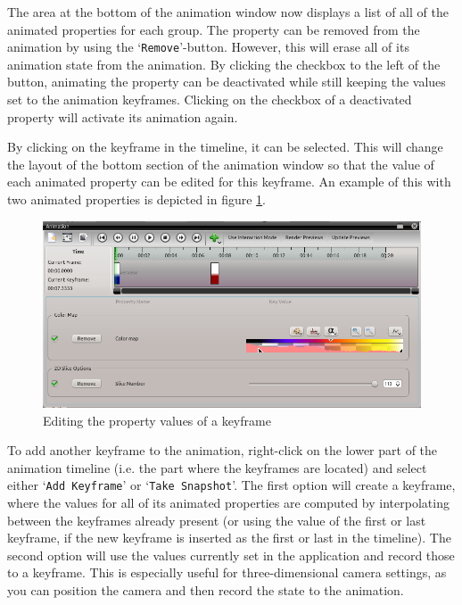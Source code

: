 The area at the bottom of the animation window now displays a list of all of the animated properties for each group. The property can be removed from the animation by using the 
`\verb|Remove|'-button. However, this will erase all of its animation state from the animation. By clicking the checkbox to the left of the button, animating the property
can be deactivated while still keeping the values set to the animation keyframes. Clicking on the checkbox of a deactivated property will activate its animation again.

By clicking on the keyframe in the timeline, it can be selected. This will change the layout of the bottom section of the animation window so that the value of each  
animated property can be edited for this keyframe. An example of this with two animated properties is depicted in figure \ref{fig:animation_keyframe_editing}.

\begin{figure}[htb]
 \centering
 \includegraphics[scale=0.5,keepaspectratio=true]{./images/animation_keyframe_editing.png}
 \caption{Editing the property values of a keyframe}
 \label{fig:animation_keyframe_editing}
\end{figure}

To add another keyframe to the animation, right-click on the lower part of the animation timeline (i.e. the part where the keyframes are located) and select either
`\verb|Add Keyframe|' or `\verb|Take Snapshot|'. The first option will create a keyframe, where the values for all of its animated properties are computed by interpolating 
between the keyframes already present (or using the value of the first or last keyframe, if the new keyframe is inserted as the first or last in the timeline). The 
second option will use the values currently set in the \Voreen application and record those to a keyframe. This is especially useful for three-dimensional camera settings,
as you can position the camera and then record the state to the animation.

